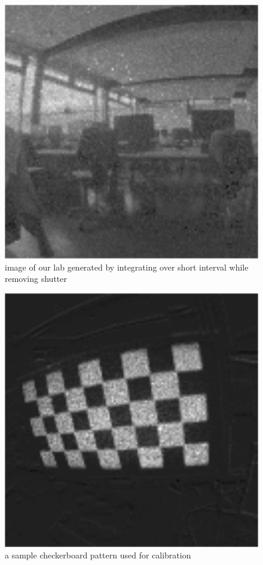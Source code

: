 \begin{figure}
\includegraphics[width=\linewidth]{images/PCLab_integrated.png}
\caption{image of our lab generated by integrating over short interval while removing shutter}
\label{fig:shutter_integration}
\end{figure}

\begin{figure}
\includegraphics[width=\linewidth]{images/checkerboard_integrated.png}
\caption{a sample checkerboard pattern used for calibration}
\label{fig:calibration}
\end{figure}



